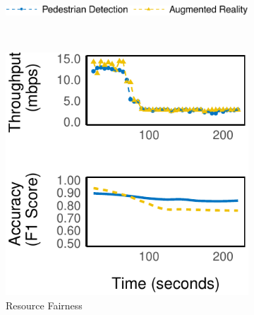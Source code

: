 \begin{figure}
  \centering
  \begin{subfigure}[t]{0.8\columnwidth}
    \centering
    \includegraphics[width=\textwidth]{figures/multitask-legend.pdf}
  \end{subfigure}
  \\
  \vspace{1em}
  \begin{subfigure}[t]{0.45\columnwidth}
    \centering
    \includegraphics[width=\textwidth]{figures/multitask-left.pdf}
    \caption{Resource Fairness}
    \label{fig:eq-bw}
  \end{subfigure}
  \hfill
  \begin{subfigure}[t]{0.45\columnwidth}
    \centering

\end{subfigure}
\end{figure}
